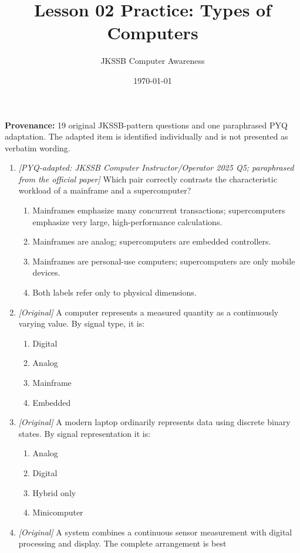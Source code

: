 \documentclass[11pt]{article}
\title{Lesson 02 Practice: Types of Computers}
\author{JKSSB Computer Awareness}
\date{\today}
\begin{document}
\maketitle
\noindent\textbf{Provenance:} 19 original JKSSB-pattern questions and one
paraphrased PYQ adaptation. The adapted item is identified individually and
is not presented as verbatim wording.

\begin{enumerate}[label=\textbf{Q\arabic*.}, leftmargin=*]
\item \textit{[PYQ-adapted: JKSSB Computer Instructor/Operator 2025 Q5;
paraphrased from the official paper]} Which pair correctly contrasts the
characteristic workload of a mainframe and a supercomputer?
  \begin{enumerate}[label=\Alph*.]
    \item Mainframes emphasize many concurrent transactions; supercomputers
      emphasize very large, high-performance calculations.
    \item Mainframes are analog; supercomputers are embedded controllers.
    \item Mainframes are personal-use computers; supercomputers are only
      mobile devices.
    \item Both labels refer only to physical dimensions.
  \end{enumerate}
\item \textit{[Original]} A computer represents a measured quantity as a
  continuously varying value. By signal type, it is:
  \begin{enumerate}[label=\Alph*.]
    \item Digital
    \item Analog
    \item Mainframe
    \item Embedded
  \end{enumerate}
\item \textit{[Original]} A modern laptop ordinarily represents data using
  discrete binary states. By signal representation it is:
  \begin{enumerate}[label=\Alph*.]
    \item Analog
    \item Digital
    \item Hybrid only
    \item Minicomputer
  \end{enumerate}
\item \textit{[Original]} A system combines a continuous sensor measurement
  with digital processing and display. The complete arrangement is best

\end{enumerate}
\end{document}

